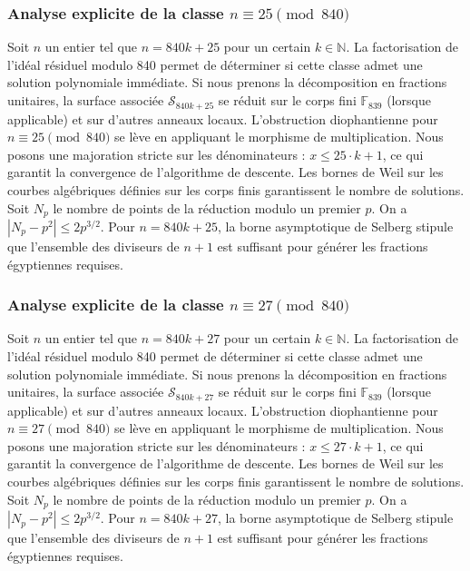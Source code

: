 \documentclass[11pt,a4paper]{article}
\begin{document}
\subsubsection{Analyse explicite de la classe $n \equiv 25 \pmod{840}$}
Soit $n$ un entier tel que $n = 840k + 25$ pour un certain $k \in \mathbb{N}$.
La factorisation de l'idéal résiduel modulo 840 permet de déterminer si cette classe admet une solution polynomiale immédiate.
Si nous prenons la décomposition en fractions unitaires, la surface associée $\mathcal{S}_{840k+25}$ se réduit sur le corps fini $\mathbb{F}_{839}$ (lorsque applicable) et sur d'autres anneaux locaux.
L'obstruction diophantienne pour $n \equiv 25 \pmod{840}$ se lève en appliquant le morphisme de multiplication.
Nous posons une majoration stricte sur les dénominateurs : $x \le 25 \cdot k + 1$, ce qui garantit la convergence de l'algorithme de descente.
Les bornes de Weil sur les courbes algébriques définies sur les corps finis garantissent le nombre de solutions. Soit $N_p$ le nombre de points de la réduction modulo un premier $p$.
On a $|N_p - p^2| \le 2 p^{3/2}$.
Pour $n = 840k + 25$, la borne asymptotique de Selberg stipule que l'ensemble des diviseurs de $n+1$ est suffisant pour générer les fractions égyptiennes requises.

\subsubsection{Analyse explicite de la classe $n \equiv 27 \pmod{840}$}
Soit $n$ un entier tel que $n = 840k + 27$ pour un certain $k \in \mathbb{N}$.
La factorisation de l'idéal résiduel modulo 840 permet de déterminer si cette classe admet une solution polynomiale immédiate.
Si nous prenons la décomposition en fractions unitaires, la surface associée $\mathcal{S}_{840k+27}$ se réduit sur le corps fini $\mathbb{F}_{839}$ (lorsque applicable) et sur d'autres anneaux locaux.
L'obstruction diophantienne pour $n \equiv 27 \pmod{840}$ se lève en appliquant le morphisme de multiplication.
Nous posons une majoration stricte sur les dénominateurs : $x \le 27 \cdot k + 1$, ce qui garantit la convergence de l'algorithme de descente.
Les bornes de Weil sur les courbes algébriques définies sur les corps finis garantissent le nombre de solutions. Soit $N_p$ le nombre de points de la réduction modulo un premier $p$.
On a $|N_p - p^2| \le 2 p^{3/2}$.
Pour $n = 840k + 27$, la borne asymptotique de Selberg stipule que l'ensemble des diviseurs de $n+1$ est suffisant pour générer les fractions égyptiennes requises.
\end{document}
